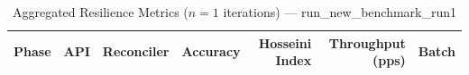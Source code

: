 
\begin{table}[htbp]
\caption{Aggregated Resilience Metrics ($n=1$ iterations) --- run_new_benchmark_run1}
\begin{tabular}{l l l r r r r}
\hline
Phase & API & Reconciler & Accuracy & Hosseini Index & Throughput (pps) & Batch \\
\hline
\hline
\end{tabular}
\end{table}
